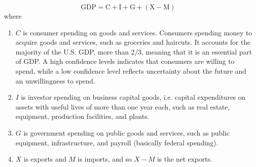 \documentclass{article}
\begin{document}
    \begin{equation}
      \text{GDP} = \text{C} + \text{I} + \text{G} + (\text{X} - \text{M})
    \end{equation}
    where
    \begin{enumerate}
      \item $C$ is consumer spending on goods and services. Consumers spending money to acquire goods and services, such as groceries and haircuts. It accounts for the majority of the U.S. GDP, more than 2/3, meaning that it is an essential part of GDP. A high confidence levels indicates that consumers are willing to spend, while a low confidence level reflects uncertainty about the future and an unwillingness to spend.
      \item $I$ is investor spending on business capital goods, i.e. capital expenditures on assets with useful lives of more than one year each, such as real estate, equipment, production facilities, and plants.
      \item $G$ is government spending on public goods and services, such as public equipment, infrastructure, and payroll (basically federal spending).
      \item $X$ is exports and $M$ is imports, and so $X - M$ is the net exports.
    \end{enumerate}
\end{document}
